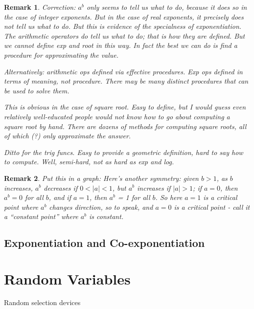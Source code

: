 \documentclass[reqno,12pt]{tufte-book}
\numberwithin{equation}{subsection}
\newtheorem{remark}{Remark}
\begin{document}
\begin{remark}
  Correction: $a^b$ only \textit{seems} to tell us what to do, because
  it does so in the case of integer exponents.  But in the case of
  real exponents, it precisely does \textit{not} tell us what to do.
  But this is evidence of the specialness of exponentiation.  The
  arithmetic operators do tell us what to do; that is how they are
  defined.  But we \textit{cannot} define exp and root in this way.
  In fact the best we can do is find a procedure for approximating the
  value.

  Alternatively: arithmetic ops defined via effective procedures.  Exp
  ops defined in terms of meaning, not procedure.  There may be many
  distinct procedures that can be used to solve them.

  This is obvious in the case of square root.  Easy to define, but I
  would guess even relatively well-educated people would not know how
  to go about computing a square root by hand.  There are dozens of
  methods for computing square roots, all of which (?) only
  approximate the answer.

  Ditto for the trig funcs.  Easy to provide a geometric definition,
  hard to say how to compute.  Well, semi-hard, not as hard as exp and
  log.

\end{remark}


\begin{remark}
  Put this in a graph: Here's another symmetry: given $b>1$, as $b$
  increases, $a^b$ decreases if $0<|a|<1$, but $a^b$ increases if
  $|a|>1$; if $a=0$, then $a^b=0$ for all $b$, and if $a=1$, then
  $a^b$ = 1 for all $b$.  So here $a=1$ is a critical point where
  $a^b$ changes direction, so to speak, and $a=0$ is a critical point
  - call it a ``constant point'' where $a^b$ is constant.

\end{remark}



\section{Exponentiation and Co-exponentiation}

\chapter{Random Variables}

Random selection devices
\end{document}
